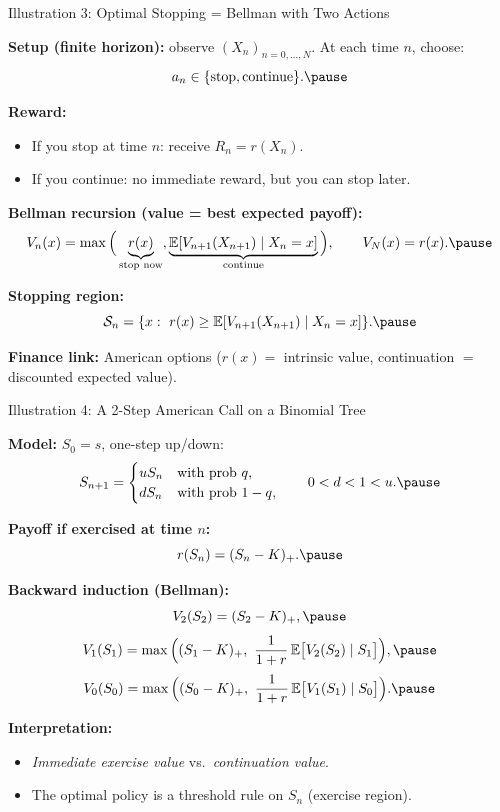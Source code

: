 \documentclass[aspectratio=169]{beamer}
\begin{document}
\begin{frame}{Illustration 3: Optimal Stopping = Bellman with Two Actions}

\textbf{Setup (finite horizon):} observe $(X_n)_{n=0,\dots,N}$.
At each time $n$, choose:
\[
a_n\in\{\text{stop},\text{continue}\}.\pause
\]

\medskip
\textbf{Reward:}
\begin{itemize}
  \item If you stop at time $n$: receive $R_n=r(X_n)$.\pause
  \item If you continue: no immediate reward, but you can stop later.\pause
\end{itemize}

\medskip
\textbf{Bellman recursion (value = best expected payoff):}
\[
V_n(x)=\max\Big(
\underbrace{r(x)}_{\text{stop now}},
\underbrace{\mathbb{E}[V_{n+1}(X_{n+1})\mid X_n=x]}_{\text{continue}}
\Big),
\qquad V_N(x)=r(x).\pause
\]

\medskip
\textbf{Stopping region:}
\[
\mathcal{S}_n=\{x:\ r(x)\ge \mathbb{E}[V_{n+1}(X_{n+1})\mid X_n=x]\}.\pause
\]

\medskip
\textbf{Finance link:} American options ($r(x)=$ intrinsic value, continuation $=$ discounted expected value).

\end{frame}

\begin{frame}{Illustration 4: A 2-Step American Call on a Binomial Tree}

\textbf{Model:} $S_0=s$, one-step up/down:
\[
S_{n+1}=
\begin{cases}
uS_n & \text{with prob } q,\\
dS_n & \text{with prob } 1-q,
\end{cases}
\qquad 0<d<1<u.\pause
\]

\medskip
\textbf{Payoff if exercised at time $n$:}
\[
r(S_n)=(S_n-K)_+.\pause
\]

\medskip
\textbf{Backward induction (Bellman):}
\[
V_2(S_2)=(S_2-K)_+,\pause
\]
\[
V_1(S_1)=\max\Big(
(S_1-K)_+,\ \frac{1}{1+r}\,\mathbb{E}\big[V_2(S_2)\mid S_1\big]
\Big),\pause
\]
\[
V_0(S_0)=\max\Big(
(S_0-K)_+,\ \frac{1}{1+r}\,\mathbb{E}\big[V_1(S_1)\mid S_0\big]
\Big).\pause
\]

\medskip
\textbf{Interpretation:}
\begin{itemize}
  \item \emph{Immediate exercise value} vs.\ \emph{continuation value}.\pause
  \item The optimal policy is a threshold rule on $S_n$ (exercise region).
\end{itemize}

\end{frame}
\end{document}

